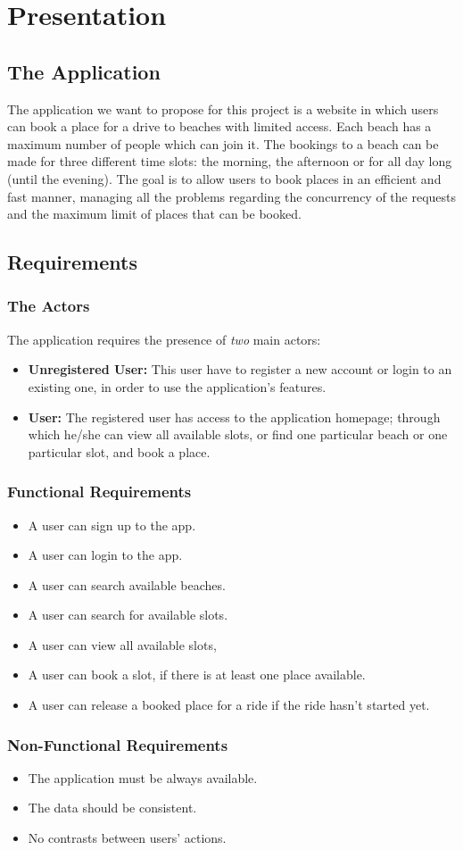 \section{Presentation}
\subsection{The Application}
The application we want to propose for this project is a website in which users can book a place for a drive to beaches with limited access. Each beach has a maximum number of people which can join it. The bookings to a beach can be made for three different time slots: the morning, the afternoon or for all day long (until the evening). The goal is to allow users to book places in an efficient and fast manner, managing all the problems regarding the concurrency of the requests and the maximum limit of places that can be booked.
\subsection{Requirements}
\subsubsection{The Actors}
The application requires the presence of \textit{two} main actors:
\begin{itemize}
    \item \textbf{Unregistered User:} This user have to register a new account or login to an existing one, in order to use the application's features.
    \item \textbf{User:} The registered user has access to the application homepage; through which he/she can view all available slots, or find one particular beach or one particular slot, and book a place. 
\end{itemize}

\subsubsection{Functional Requirements}
\begin{itemize}
    \item A user can sign up to the app.
    \item A user can login to the app.
    \item A user can search available beaches.
    \item A user can search for available slots.
    \item A user can view all available slots,
    \item A user can book a slot, if there is at least one place available.
    \item A user can release a booked place for a ride if the ride hasn't started yet.
\end{itemize}

\subsubsection{Non-Functional Requirements}
\begin{itemize}
    \item The application must be always available.
    \item The data should be consistent.
    \item No contrasts between users' actions.
\end{itemize}
